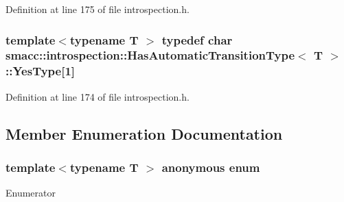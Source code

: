 Definition at line 175 of file introspection.\+h.

\subsubsection[{\texorpdfstring{Yes\+Type}{YesType}}]{\setlength{\rightskip}{0pt plus 5cm}template$<$typename T $>$ typedef char {\bf smacc\+::introspection\+::\+Has\+Automatic\+Transition\+Type}$<$ T $>$\+::Yes\+Type\mbox{[}1\mbox{]}\hspace{0.3cm}{\ttfamily [private]}}\hypertarget{classsmacc_1_1introspection_1_1HasAutomaticTransitionType_abeb599df547eb3db36684b6cb343eade}{}\label{classsmacc_1_1introspection_1_1HasAutomaticTransitionType_abeb599df547eb3db36684b6cb343eade}


Definition at line 174 of file introspection.\+h.



\subsection{Member Enumeration Documentation}
\subsubsection[{\texorpdfstring{anonymous enum}{anonymous enum}}]{\setlength{\rightskip}{0pt plus 5cm}template$<$typename T $>$ anonymous enum}\hypertarget{classsmacc_1_1introspection_1_1HasAutomaticTransitionType_ac663d77745eac0f2b2ceb29e4c8b300b}{}\label{classsmacc_1_1introspection_1_1HasAutomaticTransitionType_ac663d77745eac0f2b2ceb29e4c8b300b}
\begin{Desc}
\item[Enumerator]\par
\begin{description}
\item[{\em 
value\hypertarget{classsmacc_1_1introspection_1_1HasAutomaticTransitionType_ac663d77745eac0f2b2ceb29e4c8b300ba8aba42189dc17891761a49375684776d}{}\label{classsmacc_1_1introspection_1_1HasAutomaticTransitionType_ac663d77745eac0f2b2ceb29e4c8b300ba8aba42189dc17891761a49375684776d}
}]\end{description}
\end{Desc}


